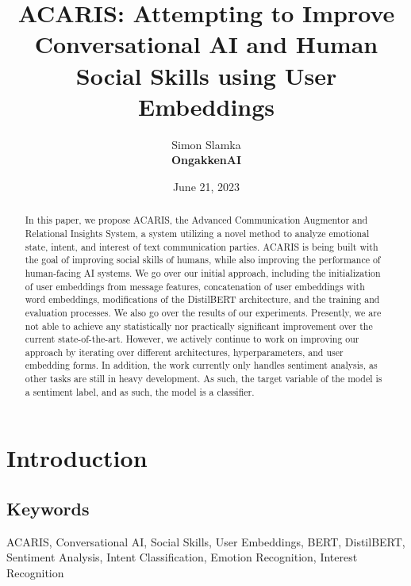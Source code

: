 \documentclass{article}
\title{ACARIS: Attempting to Improve Conversational AI and Human Social Skills using User Embeddings}
\author{Simon Slamka\\
\small\textbf{OngakkenAI}}
\date{June 21, 2023}
\begin{document}
\maketitle

\begin{abstract}
In this paper, we propose ACARIS, the Advanced Communication Augmentor and Relational Insights System, a system utilizing a novel method to analyze emotional state, intent, and interest of text communication parties. ACARIS is being built with the goal of improving social skills of humans, while also improving the performance of human-facing AI systems. We go over our initial approach, including the initialization of user embeddings from message features, concatenation of user embeddings with word embeddings, modifications of the DistilBERT architecture, and the training and evaluation processes. We also go over the results of our experiments. Presently, we are not able to achieve any statistically nor practically significant improvement over the current state-of-the-art. However, we actively continue to work on improving our approach by iterating over different architectures, hyperparameters, and user embedding forms. In addition, the work currently only handles sentiment analysis, as other tasks are still in heavy development. As such, the target variable of the model is a sentiment label, and as such, the model is a classifier.
\end{abstract}

\section{Introduction}
\subsection{Keywords}
ACARIS, Conversational AI, Social Skills, User Embeddings, BERT, DistilBERT, Sentiment Analysis, Intent Classification, Emotion Recognition, Interest Recognition
\end{document}
